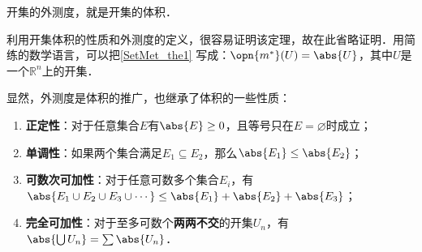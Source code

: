 \begin{theorem}{}\label{SetMet_the1}
开集的外测度，就是开集的体积．
\end{theorem}

利用开集体积的性质和外测度的定义，很容易证明该定理，故在此省略证明．用简练的数学语言，可以把\autoref{SetMet_the1} 写成：$\opn{m^*}(U)=\abs{U}$，其中$U$是一个$\mathbb{R}^n$上的开集．

显然，外测度是体积的推广，也继承了体积的一些性质：

\begin{theorem}{}
\begin{enumerate}
\item \textbf{正定性}：对于任意集合$E$有$\abs{E}\geq 0$，且等号只在$E=\varnothing$时成立；\\
\item \textbf{单调性}：如果两个集合满足$E_1\subseteq E_2$，那么$\abs{E_1}\leq \abs{E_2}$；\\
\item \textbf{可数次可加性}：对于任意可数多个集合$E_i$，有$\abs{E_1\cup E_2\cup E_3\cup \cdots}\leq \abs{E_1}+\abs{E_2}+\abs{E_3}$；\\
\item \textbf{完全可加性}：对于至多可数个\textbf{两两不交}的开集$U_n$，有$\abs{\bigcup U_n}=\sum\abs{U_n}$．
\end{enumerate}
\end{theorem}




















